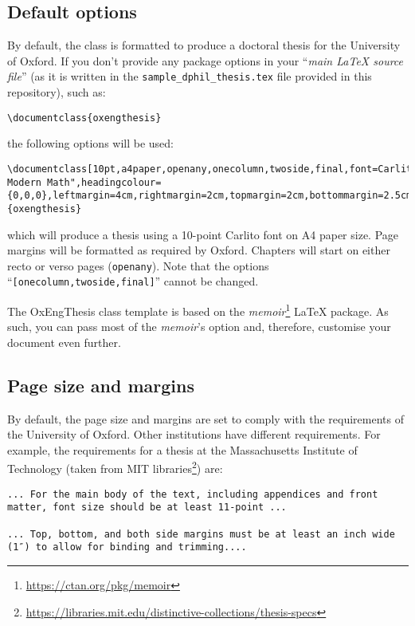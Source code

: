 \subsection{Default options}


By default, the class is formatted to produce a doctoral thesis for the University of Oxford. If you don't provide any package options in your ``\textit{main LaTeX source file}'' (as it is written in the \verb|sample_dphil_thesis.tex| file provided in this repository), such as:


\begin{lstlisting}[style=custom-latex]
\documentclass{oxengthesis}
\end{lstlisting}


\noindent the following options will be used:


\begin{lstlisting}[style=custom-latex]
\documentclass[10pt,a4paper,openany,onecolumn,twoside,final,font=Carlito,mathfont="Latin Modern Math",headingcolour={0,0,0},leftmargin=4cm,rightmargin=2cm,topmargin=2cm,bottommargin=2.5cm]{oxengthesis}
\end{lstlisting}


\noindent which will produce a thesis using a 10-point Carlito font on A4 paper size. Page margins will be formatted as required by Oxford. Chapters will start on either recto or verso pages (\verb|openany|). Note that the options ``\verb|[onecolumn,twoside,final]|'' cannot be changed.


The OxEngThesis class template is based on the \textit{memoir}\footnote{\url{https://ctan.org/pkg/memoir}} LaTeX package. As such, you can pass most of the \textit{memoir}'s option and, therefore, customise your document even further.


\subsection{Page size and margins}


By default, the page size and margins are set to comply with the requirements of the University of Oxford. Other institutions have different requirements. For example, the requirements for a thesis at the Massachusetts Institute of Technology (taken from MIT libraries\footnote{\url{https://libraries.mit.edu/distinctive-collections/thesis-specs}}) are:


\begin{lstlisting}[style=custom-text]
... For the main body of the text, including appendices and front matter, font size should be at least 11-point ...

... Top, bottom, and both side margins must be at least an inch wide (1″) to allow for binding and trimming....
\end{lstlisting}


